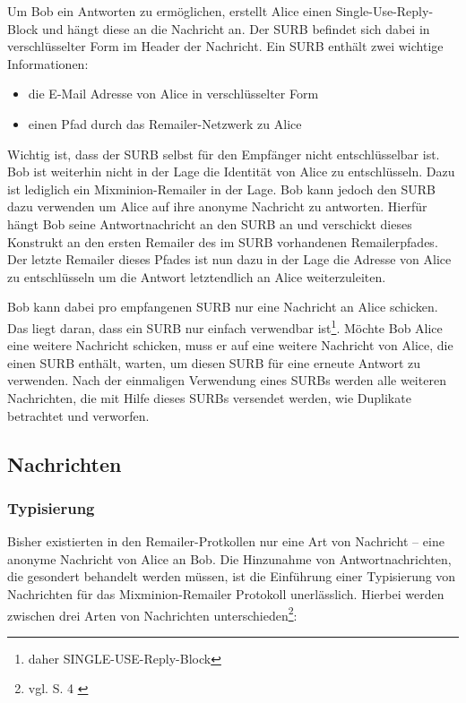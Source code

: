 Um Bob ein Antworten zu ermöglichen, erstellt Alice einen Single-Use-Reply-Block und hängt diese an die Nachricht an. Der SURB befindet sich dabei in verschlüsselter Form im Header der Nachricht. 
Ein SURB enthält zwei wichtige Informationen:
\begin{itemize}
\item die E-Mail Adresse von Alice in verschlüsselter Form
\item einen Pfad durch das Remailer-Netzwerk zu Alice
\end{itemize}

Wichtig ist, dass der SURB selbst für den Empfänger nicht entschlüsselbar ist. Bob ist weiterhin nicht in der Lage die Identität von Alice zu entschlüsseln. Dazu ist lediglich ein Mixminion-Remailer in der Lage. Bob kann jedoch den SURB dazu verwenden um Alice auf ihre anonyme Nachricht zu antworten. Hierfür hängt Bob seine Antwortnachricht an den SURB an und verschickt dieses Konstrukt an den ersten Remailer des im SURB vorhandenen Remailerpfades. Der letzte Remailer dieses Pfades ist nun dazu in der Lage die Adresse von Alice zu entschlüsseln um die Antwort letztendlich an Alice weiterzuleiten.

Bob kann dabei pro empfangenen SURB nur eine Nachricht an Alice schicken. Das liegt daran, dass ein SURB nur einfach verwendbar ist\footnote{daher SINGLE-USE-Reply-Block}. Möchte Bob Alice eine weitere Nachricht schicken, muss er auf eine weitere Nachricht von Alice, die einen SURB enthält, warten, um diesen SURB für eine erneute Antwort zu verwenden. Nach der einmaligen Verwendung eines SURBs werden alle weiteren Nachrichten, die mit Hilfe dieses SURBs versendet werden, wie Duplikate betrachtet und verworfen.

\subsection{Nachrichten}
\subsubsection{Typisierung}
Bisher existierten in den Remailer-Protkollen nur eine Art von Nachricht -- eine anonyme Nachricht von Alice an Bob. Die Hinzunahme von Antwortnachrichten, die gesondert behandelt werden müssen, ist die Einführung einer Typisierung von Nachrichten für das Mixminion-Remailer Protokoll unerlässlich. Hierbei werden zwischen drei Arten von Nachrichten unterschieden\footnote{vgl. S. 4 \cite{mixminion}}:

